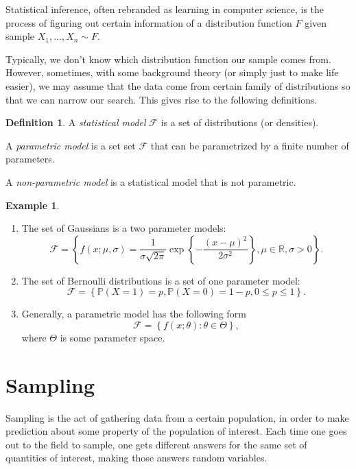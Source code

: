 \documentclass[
  openany]{book}
\theoremstyle{definition}
\newtheorem{definition}{Definition}[chapter]
\theoremstyle{definition}
\newtheorem{example}{Example}[chapter]
\theoremstyle{definition}
\theoremstyle{definition}
\theoremstyle{remark}
\begin{document}
Statistical inference, often rebranded as learning in computer science, is the process
of figuring out certain information of a distribution function \(F\) given
sample \(X_1, \dots, X_n \sim F\).

Typically, we don't know which distribution function our sample comes from.
However, sometimes, with some background theory (or simply just to make life easier),
we may assume that the data come from certain family of distributions so that
we can narrow our search.
This gives rise to the following definitions.

\begin{definition}
A \emph{statistical model} \(\mathcal{F}\) is a set of distributions (or densities).

A \emph{parametric model} is a set set \(\mathcal{F}\) that can be parametrized
by a finite number of parameters.

A \emph{non-parametric model} is a statistical model that is not parametric.
\end{definition}

\begin{example}
\leavevmode

\begin{enumerate}
\def\labelenumi{\arabic{enumi}.}
\item
  The set of Gaussians is a two parameter models:
  \[ \mathcal{F} = \left\{ f(x; \mu, \sigma) = \frac{1}{\sigma \sqrt{2 \pi}} \exp\left\{ -\frac{(x-\mu)^2}{2\sigma^2}  \right\}, \mu \in \mathbb{R}, \sigma > 0   \right\}. \]
\item
  The set of Bernoulli distributions is a set of one parameter model:
  \[ \mathcal{F} = \left\{ \mathbb{P}(X = 1) = p, \mathbb{P}(X = 0) = 1 -p, 0\leq p \leq 1   \right\}.\]
\item
  Generally, a parametric model has the following form
  \[\mathcal{F} = \left\{ f(x;\theta) : \theta \in \Theta  \right\} ,\]
  where \(\Theta\) is some parameter space.
\end{enumerate}

\end{example}

\hypertarget{sampling}{%
\chapter{Sampling}\label{sampling}}

Sampling is the act of gathering data from a certain
population, in order to make prediction about some property
of the population of interest.
Each time one goes out to the field to sample, one gets different
answers for the same set of quantities of interest, making those
answers random variables.
\end{document}
